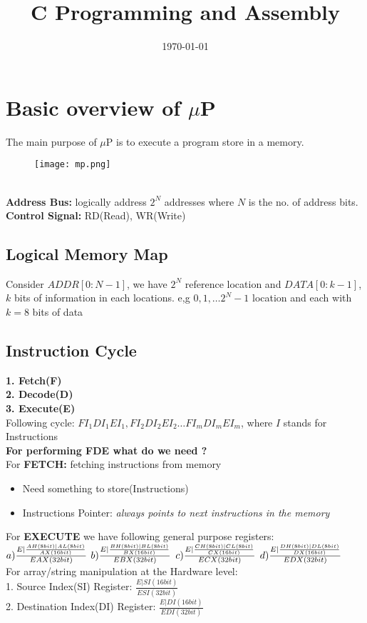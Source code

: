 \documentclass[12pt,a4paper]{article}
\title{C Programming and Assembly \vspace{-2em}}
\date{\today}
\begin{document}
  \maketitle
  
  \section{Basic overview of $\mu$P}
  The main purpose of $\mu$P is to execute a program store in a memory.\\
 \begin{figure}[h]
 	\texttt{[image: mp.png]}
 	\centering
 \end{figure}
\\
\textbf{Address Bus:} logically address $2^N$ addresses where $N$ is the no. of address bits. \\
\textbf{Control Signal:} RD(Read), WR(Write)

\subsection{Logical Memory Map}
 Consider $ADDR[0:N-1]$, we have $2^N$ reference location and $DATA[0:k-1]$, $k$ bits of information in each locations. e,g $0,1, \dots 2^N-1$ location and each with $k=8$ bits of data

\subsection{Instruction Cycle}
\textbf{1. Fetch(F)}\\
\textbf{2. Decode(D)}\\
\textbf{3. Execute(E)} \\
Following cycle: $FI_1DI_1EI_1, FI_2DI_2EI_2 \dots FI_mDI_mEI_m$, where $I$ stands for Instructions \\
\textbf{For performing FDE what do we need ?} \\
For \textbf{FETCH: } fetching instructions from memory
\begin{itemize}
	\item Need something to store(Instructions)
	\item Instructions Pointer: \textit{always points to next instructions in the memory}
\end{itemize}
For \textbf{EXECUTE} we have following general purpose registers: \\
$a) \frac{E| \frac{AH(8bit)|AL(8bit)}{\small{AX(16bit)}}}{EAX(32bit)}$
$b) \frac{E| \frac{BH(8bit)|BL(8bit)}{\small{BX(16bit)}}}{EBX(32bit)}$
$c) \frac{E| \frac{CH(8bit)|CL(8bit)}{\small{CX(16bit)}}}{ECX(32bit)}$
$d) \frac{E| \frac{DH(8bit)|DL(8bit)}{\small{DX(16bit)}}}{EDX(32bit)}$
\\
For array/string manipulation at the Hardware level:\\
1. Source Index(SI) Register: $\frac{E|SI(16bit)}{ESI(32bit)}$\\
2. Destination Index(DI) Register: $\frac{E|DI(16bit)}{EDI(32bit)}$
\\
\end{document}
